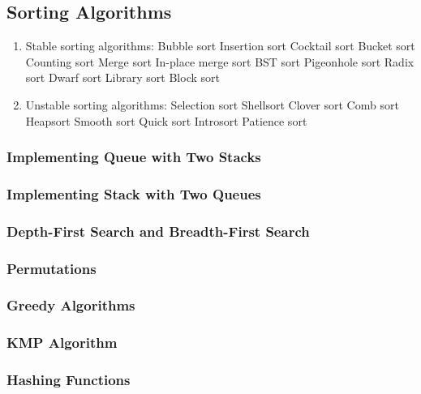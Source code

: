 \documentclass[11pt, twocolumn]{article}
\begin{document}
\subsection{Sorting Algorithms}
\begin{enumerate}
	\item Stable sorting algorithms:
	\subitem Bubble sort
	\subitem Insertion sort
	\subitem Cocktail sort
	\subitem Bucket sort
	\subitem Counting sort
	\subitem Merge sort
	\subitem In-place merge sort
	\subitem BST sort
	\subitem Pigeonhole sort
	\subitem Radix sort
	\subitem Dwarf sort
	\subitem Library sort
	\subitem Block sort
	\item Unstable sorting algorithms:
	\subitem Selection sort
	\subitem Shellsort
	\subitem Clover sort
	\subitem Comb sort
	\subitem Heapsort
	\subitem Smooth sort
	\subitem Quick sort
	\subitem Introsort
	\subitem Patience sort
\end{enumerate}

\subsubsection{Implementing Queue with Two Stacks}

\subsubsection{Implementing Stack with Two Queues}

\subsubsection{Depth-First Search and Breadth-First Search}

\subsubsection{Permutations}

\subsubsection{Greedy Algorithms}

\subsubsection{KMP Algorithm}

\subsubsection{Hashing Functions}
\end{document}
